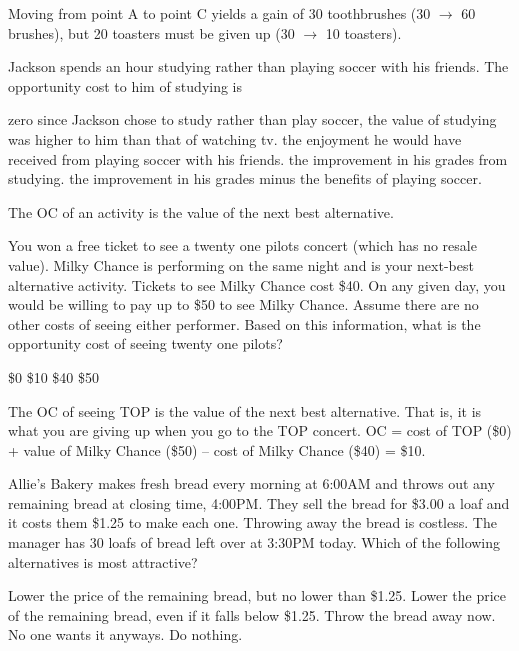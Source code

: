 \documentclass[addpoints,11pt]{exam}
\theoremstyle{definition}
\begin{document}
\begin{questions}
	\begin{solution}
		Moving from point A to point C yields a gain of 30 toothbrushes (30 $\rightarrow$ 60 brushes), but 20 toasters must be given up (30 $\rightarrow$ 10 toasters).
	\end{solution}
			
	\question Jackson spends an hour studying rather than playing soccer with his friends. The opportunity cost to him of studying is
		\begin{choices}
			\choice zero since Jackson chose to study rather than play soccer, the value of studying was higher to him than that of watching tv.
			\CorrectChoice the enjoyment he would have received from playing soccer with his friends.
			\choice the improvement in his grades from studying.
			\choice the improvement in his grades minus the benefits of playing soccer.
		\end{choices}
		
		\begin{solution}
			The OC of an activity is the value of the next best alternative.
		\end{solution}
		
	\question You won a free ticket to see a twenty one pilots concert (which has no resale value). Milky Chance is performing on the same night and is your next-best alternative activity. Tickets to see Milky Chance cost \$40. On any given day, you would be willing to pay up to \$50 to see Milky Chance. Assume there are no other costs of seeing either performer. Based on this information, what is the opportunity cost of seeing twenty one pilots?
		\begin{choices}
			\choice \$0
			\CorrectChoice \$10
			\choice \$40
			\choice \$50
		\end{choices}
		
		\begin{solution}
			The OC of seeing TOP is the value of the next best alternative. That is, it is what you are giving up when you go to the TOP concert. OC = cost of TOP (\$0) + value of Milky Chance (\$50) -- cost of Milky Chance (\$40) = \$10.
		\end{solution}
		
	\question Allie's Bakery makes fresh bread every morning at 6:00AM and throws out any remaining bread at closing time, 4:00PM. They sell the bread for \$3.00 a loaf and it costs them \$1.25 to make each one. Throwing away the bread is costless. The manager has 30 loafs of bread left over at 3:30PM today. Which of the following alternatives is most attractive?
		\begin{choices}
			\choice Lower the price of the remaining bread, but no lower than \$1.25.
			\CorrectChoice Lower the price of the remaining bread, even if it falls below \$1.25.
			\choice Throw the bread away now. No one wants it anyways.
			\choice Do nothing.
		\end{choices}
		

\end{questions}
\end{document}
